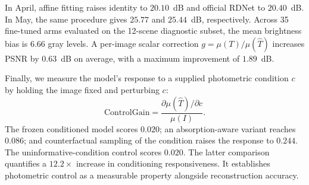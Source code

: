 In April, affine fitting raises identity to
$20.10$~dB and official RDNet to $20.40$~dB.
In May, the same procedure gives $25.77$ and
$25.44$~dB, respectively. Across 35 fine-tuned
arms evaluated on the 12-scene diagnostic subset,
the mean brightness bias is $6.66$ gray levels.
A per-image scalar correction
$g=\mu(T)/\mu(\hat T)$ increases PSNR by
$0.63$~dB on average, with a maximum
improvement of $1.89$~dB.

Finally, we measure the model's response to a
supplied photometric condition $c$ by holding
the image fixed and perturbing $c$:
\[
\mathrm{ControlGain}=
\frac{\partial\mu(\hat T)/\partial c}{\mu(I)}.
\]
The frozen conditioned model scores $0.020$;
an absorption-aware variant reaches $0.086$;
and counterfactual sampling of the condition
raises the response to $0.244$. The
uninformative-condition control scores $0.020$.
The latter comparison quantifies a $12.2\times$
increase in conditioning responsiveness.
It establishes photometric control as a
measurable property alongside reconstruction
accuracy.
